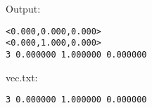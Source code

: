 \documentclass[12pt, a4paper]{article}
\begin{document}
Output:\\
\begin{scriptsize}
\begin{ttfamily}
\begin{lstlisting}
<0.000,0.000,0.000>
<0.000,1.000,0.000>
3 0.000000 1.000000 0.000000 
\end{lstlisting}
\end{ttfamily}
\end{scriptsize}

vec.txt:\\
\begin{scriptsize}
\begin{ttfamily}
\begin{lstlisting}
3 0.000000 1.000000 0.000000
\end{lstlisting}
\end{ttfamily}
\end{scriptsize}
\end{document}
